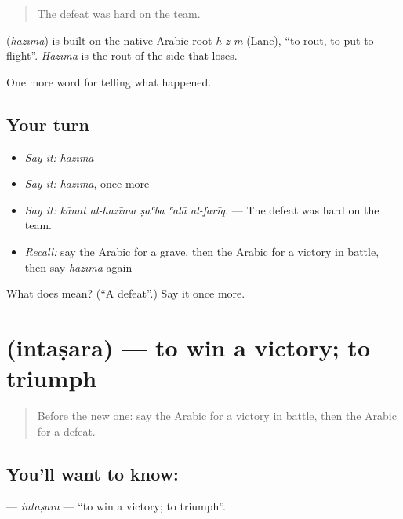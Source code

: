 \begin{quote}
The defeat was hard on the team.
\end{quote}

\begin{cousinweb}
\textbf{} (\emph{hazīma}) is built on the native Arabic root \emph{h-z-m} (Lane), \textquotedblleft{}to rout, to put to flight\textquotedblright{}. \emph{Hazīma} is the rout of the side that loses.
\end{cousinweb}

\begin{grammarlens}[title={What you've built}]
One more word for telling what happened.
\end{grammarlens}

\subsection*{Your turn}
\begin{itemize}
\raggedright
  \item \emph{Say it:} \emph{hazīma}
  \item \emph{Say it:} \emph{hazīma}, once more
  \item \emph{Say it:} \emph{kānat al-hazīma ṣaʿba ʿalā al-farīq.} — The defeat was hard on the team.
  \item \emph{Recall:} say the Arabic for a grave, then the Arabic for a victory in battle, then say \emph{hazīma} again
\end{itemize}

\begin{tcolorbox}[breakable,colback=teal!4,colframe=teal!35!black,title={Before you move on}]
What does  mean? (\textquotedblleft{}A defeat\textquotedblright{}.) Say it once more.
\end{tcolorbox}
\section[\texorpdfstring{\ar{انتصر} (intaṣara)}{انتصر (intaṣara)}]{ (intaṣara) — to win a victory; to triumph}

\label{lesson:AR-C315-intasara}



\begin{quote}
Before the new one: say the Arabic for a victory in battle, then the Arabic for a defeat.
\end{quote}

\subsection*{You'll want to know: }
\textbf{} — \emph{intaṣara} — \textquotedblleft{}to win a victory; to triumph\textquotedblright{}.

